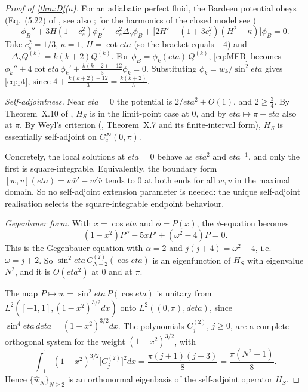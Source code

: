 \documentclass[11pt]{article}
\theoremstyle{canonmath}
\theoremstyle{canonpostulate}
\theoremstyle{canonproposition}
\theoremstyle{canonmath}
\theoremstyle{canonproposition}
\def\mathcal#1{#1}%
\def\eta{eta}%
\begin{document}
\begin{proof}[Proof of \cref{thm:D}(a)]
For an adiabatic perfect fluid, the Bardeen potential obeys (Eq.~(5.22) of \cite{MFB1992}, see also \cite{Bardeen1980,Stewart1990,KodamaSasaki1984}; for the harmonics of the closed model see \cite{Harrison1967})
\begin{equation}
\phi_B'' + 3\mathcal{H}(1+c_s^2)\phi_B' - c_s^2\Delta_\gamma\phi_B + \bigl[2\mathcal{H}' + (1+3c_s^2)(\mathcal{H}^2-\kappa)\bigr]\phi_B = 0.
\label{eq:MFB}
\end{equation}
Take $c_s^2 = 1/3$, $\kappa = 1$, $\mathcal{H} = \cot\eta$ (so the bracket equals $-4$) and $-\Delta_\gamma Q^{(k)} = k(k+2)Q^{(k)}$. For $\phi_B = \phi_k(\eta)\,Q^{(k)}$, \eqref{eq:MFB} becomes $\phi_k'' + 4\cot\eta\,\phi_k' + \tfrac{k(k+2)-12}{3}\phi_k = 0$. Substituting $\phi_k = w_k/\sin^2\eta$ gives \eqref{eq:pt}, since $4 + \tfrac{k(k+2)-12}{3} = \tfrac{k(k+2)}{3}$.

\emph{Self-adjointness.} Near $\eta = 0$ the potential is $2/\eta^2 + O(1)$, and $2\ge\tfrac34$. By Theorem~X.10 of \cite{ReedSimonII}, $\mathcal{H}_S$ is in the limit-point case at $0$, and by $\eta\mapsto\pi-\eta$ also at $\pi$. By Weyl's criterion (\cite[§X.1]{ReedSimonII}, Theorem~X.7 and its finite-interval form), $\mathcal{H}_S$ is essentially self-adjoint on $C_c^\infty(0,\pi)$.

Concretely, the local solutions at $\eta = 0$ behave as $\eta^2$ and $\eta^{-1}$, and only the first is square-integrable. Equivalently, the boundary form $[w,v](\eta) = w\bar v' - w'\bar v$ tends to $0$ at both ends for all $w,v$ in the maximal domain. So no self-adjoint extension parameter is needed: the unique self-adjoint realisation selects the square-integrable endpoint behaviour.

\emph{Gegenbauer form.} With $x = \cos\eta$ and $\phi = P(x)$, the $\phi$-equation becomes
\[
(1-x^2)P'' - 5xP' + (\omega^2-4)P = 0 .
\]
This is the Gegenbauer equation with $\alpha = 2$ and $j(j+4) = \omega^2-4$, i.e.\ $\omega = j+2$. So $\sin^2\eta\,C^{(2)}_{N-2}(\cos\eta)$ is an eigenfunction of $\mathcal{H}_S$ with eigenvalue $N^2$, and it is $O(\eta^2)$ at $0$ and at $\pi$.

The map $P\mapsto w = \sin^2\eta\,P(\cos\eta)$ is unitary from $L^2([-1,1],(1-x^2)^{3/2}dx)$ onto $L^2((0,\pi),d\eta)$, since $\sin^4\eta\,d\eta = (1-x^2)^{3/2}dx$. The polynomials $C^{(2)}_j$, $j\ge0$, are a complete orthogonal system for the weight $(1-x^2)^{3/2}$, with
\[
\int_{-1}^1(1-x^2)^{3/2}\bigl[C^{(2)}_j\bigr]^2dx = \frac{\pi(j+1)(j+3)}{8} = \frac{\pi(N^2-1)}{8}.
\]
Hence $\{\hat w_N\}_{N\ge2}$ is an orthonormal eigenbasis of the self-adjoint operator $\mathcal{H}_S$.


\end{proof}
\end{document}
